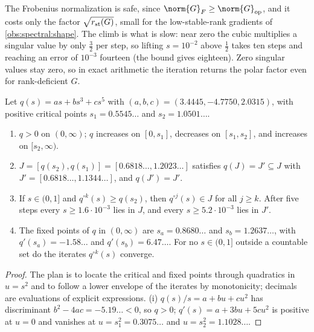 \begin{refsection}
The Frobenius normalization is safe, since $\norm{G}_F\ge\norm{G}_{\op}$, and it costs only the factor $\sqrt{r_{\mathrm{st}}(G)}$, small for the low-stable-rank gradients of \cref{obs:spectral:shape}. The climb is what is slow: near zero the cubic multiplies a singular value by only $\frac32$ per step, so lifting $s=10^{-2}$ above $\frac12$ takes ten steps and reaching an error of $10^{-3}$ fourteen (the bound gives eighteen). Zero singular values stay zero, so in exact arithmetic the iteration returns the polar factor even for rank-deficient $G$.

\begin{proposition}\label{prop:spectral:quintic}
Let $q(s)=as+bs^3+cs^5$ with $(a,b,c)=(3.4445,-4.7750,2.0315)$, with positive critical points $s_1=0.5545\ldots$ and $s_2=1.0501\ldots$.
\begin{enumerate}
\item $q>0$ on $(0,\infty)$; $q$ increases on $[0,s_1]$, decreases on $[s_1,s_2]$, and increases on $[s_2,\infty)$.
\item $J=[q(s_2),q(s_1)]=[0.6818\ldots,1.2023\ldots]$ satisfies $q(J)=J'\subseteq J$ with $J'=[0.6818\ldots,1.1344\ldots]$, and $q(J')=J'$.
\item If $s\in(0,1]$ and $q^{\circ k}(s)\ge q(s_2)$, then $q^{\circ j}(s)\in J$ for all $j\ge k$. After five steps every $s\ge1.6\cdot10^{-3}$ lies in $J$, and every $s\ge5.2\cdot10^{-3}$ lies in $J'$.
\item The fixed points of $q$ in $(0,\infty)$ are $s_a=0.8680\ldots$ and $s_b=1.2637\ldots$, with $q'(s_a)=-1.58\ldots$ and $q'(s_b)=6.47\ldots$. For no $s\in(0,1]$ outside a countable set do the iterates $q^{\circ k}(s)$ converge.
\end{enumerate}
\end{proposition}

\begin{proof}
The plan is to locate the critical and fixed points through quadratics in $u=s^2$ and to follow a lower envelope of the iterates by monotonicity; decimals are evaluations of explicit expressions. (i) $q(s)/s=a+bu+cu^2$ has discriminant $b^2-4ac=-5.19\ldots<0$, so $q>0$; $q'(s)=a+3bu+5cu^2$ is positive at $u=0$ and vanishes at $u=s_1^2=0.3075\ldots$ and $u=s_2^2=1.1028\ldots$.


\end{proof}
\end{refsection}
